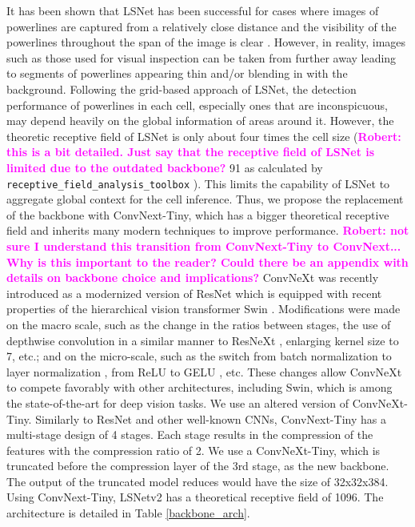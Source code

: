 \documentclass[journal]{IEEEtran}
\newcommand{\commentR}[1]{\textbf{\textcolor{magenta}{Robert: #1}}}
\begin{document}
It has been shown that LSNet has been successful for cases where images of powerlines are captured from a relatively close distance and the visibility of the powerlines throughout the span of the image is clear \cite{Nguyen2020}. However, in reality, images such as those used for visual inspection can be taken from further away leading to segments of powerlines appearing thin and/or blending in with the background. Following the grid-based approach of LSNet, the detection performance of powerlines in each cell, especially ones that are inconspicuous, may depend heavily on the global information of areas around it. However, the theoretic receptive field of LSNet is only about four times the cell size (\commentR{this is a bit detailed. Just say that the receptive field of LSNet is limited due to the outdated backbone?} 91 as calculated by \texttt{receptive\_field\_analysis\_toolbox} \cite{receptive_field_analysis_toolbox}). This limits the capability of LSNet to aggregate global context for the cell inference. Thus, we propose the replacement of the backbone with ConvNext-Tiny, which has a bigger theoretical receptive field and inherits many modern techniques to improve performance. \commentR{not sure I understand this transition from ConvNext-Tiny to ConvNext... Why is this important to the reader? Could there be an appendix with details on backbone choice and implications?} ConvNeXt was recently introduced as a modernized version of ResNet \cite{resnet} which is equipped with recent properties of the hierarchical vision transformer Swin \cite{swin}. Modifications were made on the macro scale, such as the change in the ratios between stages, the use of depthwise convolution in a similar manner to ResNeXt \cite{resnext}, enlarging kernel size to 7, etc.; and on the micro-scale, such as the switch from batch normalization \cite{batchnorm} to layer normalization \cite{layernorm}, from ReLU \cite{relu} to GELU \cite{gelu}, etc. These changes allow ConvNeXt to compete favorably with other architectures, including Swin, which is among the state-of-the-art for deep vision tasks. We use an altered version of ConvNeXt-Tiny. Similarly to ResNet and other well-known CNNs, ConvNext-Tiny has a multi-stage design of 4 stages. Each stage results in the compression of the features with the compression ratio of 2. We use a ConvNeXt-Tiny, which is truncated before the compression layer of the 3rd stage, as the new backbone. The output of the truncated model reduces would have the size of 32x32x384. Using ConvNext-Tiny, LSNetv2 has a theoretical receptive field of 1096. The architecture is detailed in Table \ref{backbone_arch}.
\end{document}
